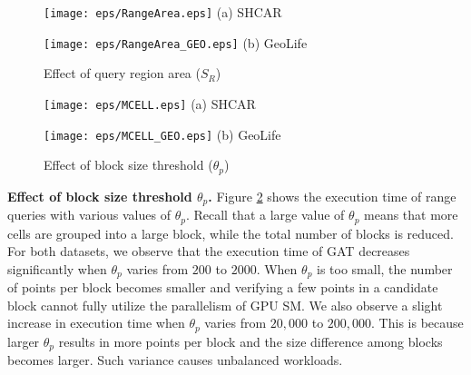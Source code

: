 \documentclass[10pt,conference,letterpaper]{IEEEtran}
\newcommand{\frname}{GAT\xspace }
\newcommand{\rangeq}{{{\cal Q}_r}\xspace}
\begin{document}
\begin{figure}[!t]\centering
	\scriptsize{
		\begin{minipage}{0.48\linewidth}
			\centering
			\texttt{[image: eps/RangeArea.eps]}
			(a) SHCAR
		\end{minipage}
		\hfill
		\begin{minipage}{0.48\linewidth}
			\centering
			\texttt{[image: eps/RangeArea\_GEO.eps]}
			(b) GeoLife
		\end{minipage}
	}
	\caption{Effect of query region area ($S_R$) \label{fig:RANGE}}
	\vspace{-.1in}
\end{figure}
\begin{figure}[t]\centering
	\scriptsize{
		\begin{minipage}{0.48\linewidth}
			\centering
			\texttt{[image: eps/MCELL.eps]}
			(a) SHCAR
		\end{minipage}
		\hfill
		\begin{minipage}{0.48\linewidth}
			\centering
			\texttt{[image: eps/MCELL\_GEO.eps]}
			(b) GeoLife
		\end{minipage}
	}
	\caption{Effect of block size threshold ($\theta_p$) \label{fig:MCELL}}
	\vspace{-.1in}
\end{figure}

\vspace{0.1cm}\textbf{Effect of block size threshold $\theta_p$.}
Figure \ref{fig:MCELL} shows the execution time of range queries with various values of $\theta_p$. Recall that a large value of $\theta_p$ means that more cells are grouped into a large block, while the total number of blocks is reduced.
For both datasets, we observe that the execution time of \frname decreases significantly when $\theta_p$ varies from $200$ to $2000$.
When $\theta_p$ is too small, the number of points per block becomes smaller and verifying a few points in a candidate block cannot fully utilize the parallelism of GPU SM.
We also observe a slight increase in execution time when $\theta_p$ varies from $20,000$ to $200,000$. This is because larger $\theta_p$ results in more points per block and the size difference among blocks becomes larger. Such variance causes unbalanced workloads.
\end{document}
